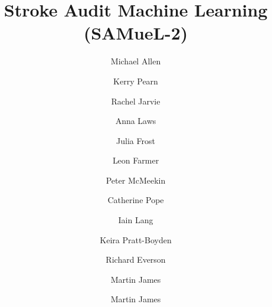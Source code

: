 \title{Stroke Audit Machine Learning (SAMueL-2)}



\renewcommand{\thefootnote}{\fnsymbol{footnote}}

\author[*1,2]{Michael Allen}
\author[1,2]{Kerry Pearn}
\author[1]{Rachel Jarvie}
\author[1]{Anna Laws}
\author[1]{Julia Frost}
\author[1]{Leon Farmer}
\author[3]{Peter McMeekin}
\author[4]{Catherine Pope}
\author[1]{Iain Lang}
\author[1]{Keira Pratt-Boyden}
\author[1]{Richard Everson}
\author[1,5]{Martin James}


\author[1,2]{Martin James}

